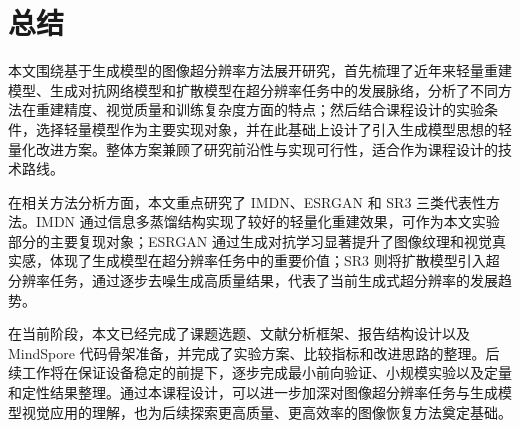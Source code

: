 \documentclass[bwprint]{report}
\begin{document}
\section{总结}
本文围绕基于生成模型的图像超分辨率方法展开研究，首先梳理了近年来轻量重建模型、生成对抗网络模型和扩散模型在超分辨率任务中的发展脉络，分析了不同方法在重建精度、视觉质量和训练复杂度方面的特点；然后结合课程设计的实验条件，选择轻量模型作为主要实现对象，并在此基础上设计了引入生成模型思想的轻量化改进方案。整体方案兼顾了研究前沿性与实现可行性，适合作为课程设计的技术路线。

在相关方法分析方面，本文重点研究了 IMDN、ESRGAN 和 SR3 三类代表性方法。IMDN 通过信息多蒸馏结构实现了较好的轻量化重建效果，可作为本文实验部分的主要复现对象\cite{hui2019imdn}；ESRGAN 通过生成对抗学习显著提升了图像纹理和视觉真实感，体现了生成模型在超分辨率任务中的重要价值\cite{wang2018esrgan}；SR3 则将扩散模型引入超分辨率任务，通过逐步去噪生成高质量结果，代表了当前生成式超分辨率的发展趋势\cite{saharia2021sr3}。

在当前阶段，本文已经完成了课题选题、文献分析框架、报告结构设计以及 MindSpore 代码骨架准备，并完成了实验方案、比较指标和改进思路的整理。后续工作将在保证设备稳定的前提下，逐步完成最小前向验证、小规模实验以及定量和定性结果整理。通过本课程设计，可以进一步加深对图像超分辨率任务与生成模型视觉应用的理解，也为后续探索更高质量、更高效率的图像恢复方法奠定基础。



\end{document}
